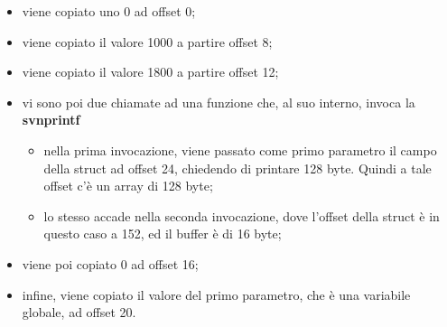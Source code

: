 \documentclass[12pt]{extarticle}
\begin{document}
\begin{itemize}
\item viene copiato uno 0 ad offset 0;
\item viene copiato il valore 1000 a partire offset 8;
\item viene copiato il valore 1800 a partire offset 12;
\item vi sono poi due chiamate ad una funzione che, al suo interno, invoca la \textbf{svnprintf}
\begin{itemize}
\item nella prima invocazione, viene passato come primo parametro il campo della struct ad offset 24, chiedendo di printare 128 byte. Quindi a tale offset c'è un array di 128 byte;
\item lo stesso accade nella seconda invocazione, dove l'offset della struct è in questo caso a 152, ed il buffer è di 16 byte;
\end{itemize}
\item viene poi copiato 0 ad offset 16;
\item infine, viene copiato il valore del primo parametro, che è una variabile globale, ad offset 20.
\end{itemize}
\end{document}
